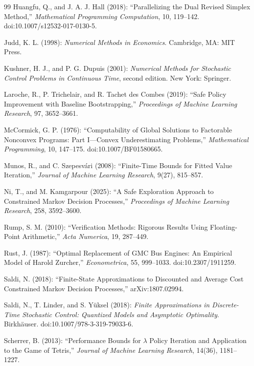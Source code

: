\begin{thebibliography}{99}
Huangfu, Q., and J. A. J. Hall (2018): ``Parallelizing the Dual Revised Simplex Method,'' \emph{Mathematical Programming Computation}, 10, 119--142. doi:10.1007/s12532-017-0130-5.

Judd, K. L. (1998): \emph{Numerical Methods in Economics}. Cambridge, MA: MIT Press.

Kushner, H. J., and P. G. Dupuis (2001): \emph{Numerical Methods for Stochastic Control Problems in Continuous Time}, second edition. New York: Springer.

Laroche, R., P. Trichelair, and R. Tachet des Combes (2019): ``Safe Policy Improvement with Baseline Bootstrapping,'' \emph{Proceedings of Machine Learning Research}, 97, 3652--3661.

McCormick, G. P. (1976): ``Computability of Global Solutions to Factorable Nonconvex Programs: Part I---Convex Underestimating Problems,'' \emph{Mathematical Programming}, 10, 147--175. doi:10.1007/BF01580665.

Munos, R., and C. Szepesv\'ari (2008): ``Finite-Time Bounds for Fitted Value Iteration,'' \emph{Journal of Machine Learning Research}, 9(27), 815--857.

Ni, T., and M. Kamgarpour (2025): ``A Safe Exploration Approach to Constrained Markov Decision Processes,'' \emph{Proceedings of Machine Learning Research}, 258, 3592--3600.

Rump, S. M. (2010): ``Verification Methods: Rigorous Results Using Floating-Point Arithmetic,'' \emph{Acta Numerica}, 19, 287--449.

Rust, J. (1987): ``Optimal Replacement of GMC Bus Engines: An Empirical Model of Harold Zurcher,'' \emph{Econometrica}, 55, 999--1033. doi:10.2307/1911259.

Saldi, N. (2018): ``Finite-State Approximations to Discounted and Average Cost Constrained Markov Decision Processes,'' arXiv:1807.02994.

Saldi, N., T. Linder, and S. Y\"uksel (2018): \emph{Finite Approximations in Discrete-Time Stochastic Control: Quantized Models and Asymptotic Optimality}. Birkh\"auser. doi:10.1007/978-3-319-79033-6.

Scherrer, B. (2013): ``Performance Bounds for $\lambda$ Policy Iteration and Application to the Game of Tetris,'' \emph{Journal of Machine Learning Research}, 14(36), 1181--1227.

\end{thebibliography}

\endgroup
